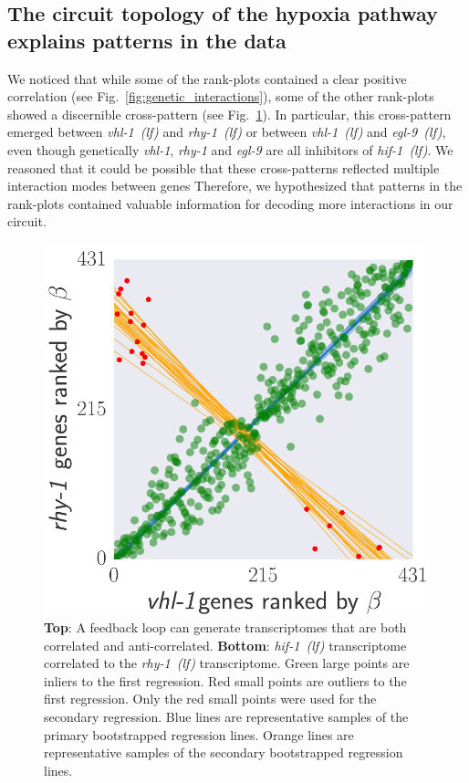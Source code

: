 \documentclass[9pt,twocolumn,twoside]{pnas-new}
\newcommand{\gene}[1]{\emph{#1}}
\newcommand{\egl}{\emph{egl-9~(lf)}}
\newcommand{\rhy}{\emph{rhy-1~(lf)}}
\newcommand{\vhl}{\emph{vhl-1~(lf)}}
\newcommand{\hif}{\emph{hif-1~(lf)}}
\begin{document}
\subsection*{The circuit topology of the hypoxia pathway explains patterns in
            the data}
\label{sub:topology}
We noticed that while some of the rank-plots contained a clear positive correlation
(see Fig.~\ref{fig:genetic_interactions}), some of the other rank-plots showed
a discernible cross-pattern (see Fig.~\ref{fig:xpattern}). In particular, this
cross-pattern emerged between \vhl{} and \rhy{} or between \vhl{} and \egl{},
even though genetically \gene{vhl-1}, \gene{rhy-1} and \gene{egl-9} are all
inhibitors of \hif{}. We reasoned that it could be possible that these
cross-patterns reflected multiple interaction modes between genes
Therefore, we hypothesized that patterns in the rank-plots contained
valuable information for decoding more interactions in our circuit.

\begin{figure}[tbhp]
\centering
\includegraphics[width=\linewidth]{figs/correlative_genetics2.pdf}
\caption{
\textbf{Top}: A feedback loop can generate transcriptomes that are both
correlated and anti-correlated. \textbf{Bottom}: \hif{} transcriptome correlated
to the \rhy{} transcriptome. Green large points are inliers to the first
regression. Red small points are outliers to the first regression. Only the red
small points were used for the secondary regression. Blue lines are representative
samples of the primary bootstrapped regression lines. Orange lines are
representative samples of the secondary bootstrapped regression lines.
}
\label{fig:xpattern}
\end{figure}
\end{document}
